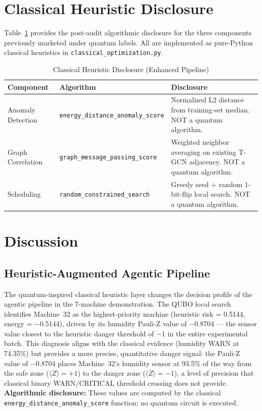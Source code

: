 \section{Classical Heuristic Disclosure}
\label{sec:heuristic_disclosure}

Table~\ref{tab:heur_d} provides the post-audit algorithmic disclosure for the three components previously marketed under quantum labels. All are implemented as pure-Python classical heuristics in \texttt{classical\_optimization.py}.
\begin{table}[!htbp]
\centering
\caption{Classical Heuristic Disclosure (Enhanced Pipeline)}
\label{tab:heur_d}
\begin{tabular}{lll}
\hline
\textbf{Component} & \textbf{Algorithm} & \textbf{Disclosure} \\
\hline
Anomaly Detection & \texttt{energy\_distance\_anomaly\_score} & Normalized L2 distance from training-set median. NOT a quantum algorithm. \\
Graph Correlation & \texttt{graph\_message\_passing\_score} & Weighted neighbor averaging on existing T-GCN adjacency. NOT a quantum algorithm. \\
Scheduling & \texttt{random\_constrained\_search} & Greedy seed + random 1-bit-flip local search. NOT a quantum algorithm. \\
\hline
\end{tabular}
\end{table}


\section{Discussion}

\subsection{Heuristic-Augmented Agentic Pipeline}

The quantum-inspired classical heuristic layer changes the decision profile of the agentic pipeline in the 7-machine demonstration. The QUBO local search identifies Machine~32 as the highest-priority machine (heuristic risk = 0.5144, energy = $-$0.5144), driven by its humidity Pauli-Z value of $-$0.8704 --- the sensor value closest to the heuristic danger threshold of $-1$ in the entire experimental batch. This diagnosis aligns with the classical evidence (humidity WARN at 74.35\%) but provides a more precise, quantitative danger signal: the Pauli-Z value of $-$0.8704 places Machine~32's humidity sensor at 93.5\% of the way from the safe zone ($\langle Z \rangle = +1$) to the danger zone ($\langle Z \rangle = -1$), a level of precision that classical binary WARN/CRITICAL threshold crossing does not provide. \textbf{Algorithmic disclosure:} These values are computed by the classical \texttt{energy\_distance\_anomaly\_score} function; no quantum circuit is executed.

